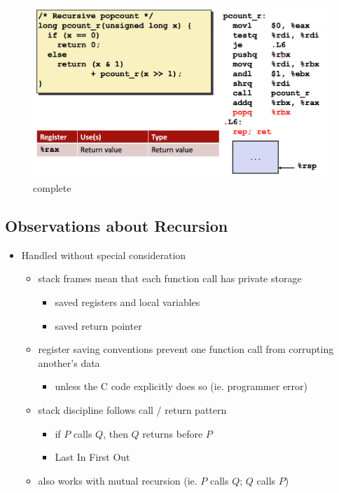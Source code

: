 \documentclass[12pt]{book}
\begin{document}
\begin{figure}
        \centering
        \includegraphics[scale = 0.2]{./figures/rec6}
        \caption{complete}
\end{figure}
\pagebreak

\subsection*{Observations about Recursion}
\begin{itemize}
        \item Handled without special consideration
        \begin{itemize}
                \item stack frames mean that each function call has private storage
                \begin{itemize}
                        \item saved registers and local variables
                        \item saved return pointer
                \end{itemize}
                \item register saving conventions prevent one function call from corrupting another's data
                \begin{itemize}
                        \item unless the C code explicitly does so (ie. programmer error)
                \end{itemize}
        \item stack discipline follows call / return pattern
                \begin{itemize}
                        \item if $P$ calls  $Q$, then  $Q$ returns before  $P$
                        \item Last In First Out
                \end{itemize}
        \item also works with mutual recursion (ie. $P$ calls  $Q$;  $Q$ calls  $P$)
        \end{itemize}
\end{itemize}
\end{document}
